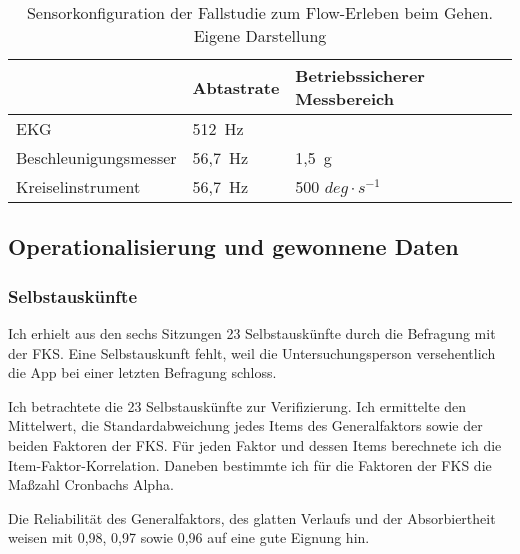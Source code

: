 \begin{table}[t]
	\caption[Sensorkonfiguration der Fallstudie zum Flow-Erleben beim Gehen]{Sensorkonfiguration der Fallstudie zum Flow-Erleben beim Gehen. Eigene Darstellung}
	\label{tab:sensorkonfiguration_fallstudie_gehen}
	\begin{tabularx}{\textwidth}{p{} p{} p{}}
\toprule
& Abtastrate & Betriebssicherer Messbereich \\
\midrule
EKG & 512~Hz & \\
Beschleunigungsmesser & 56,7~Hz & 1,5~g \\
Kreiselinstrument & 56,7~Hz & 500 $deg \cdot s^{-1}$ \\
\bottomrule
\end{tabularx}
\end{table}

\subsection{Operationalisierung und gewonnene Daten}
\subsubsection{Selbstauskünfte}

Ich erhielt aus den sechs Sitzungen 23 Selbstauskünfte durch die Befragung mit der \ac{FKS}. Eine Selbstauskunft fehlt, weil die Untersuchungsperson versehentlich die App bei einer letzten Befragung schloss.

Ich betrachtete die 23 Selbstauskünfte zur Verifizierung. Ich ermittelte den Mittelwert, die Standardabweichung jedes Items des Generalfaktors sowie der beiden Faktoren der \ac{FKS}. Für jeden Faktor und dessen Items berechnete ich die Item-Faktor-Korrelation. Daneben bestimmte ich für die Faktoren der \ac{FKS} die Maßzahl Cronbachs Alpha.

Die Reliabilität des Generalfaktors, des glatten Verlaufs und der Absorbiertheit weisen mit 0,98, 0,97 sowie 0,96 auf eine gute Eignung hin. 


